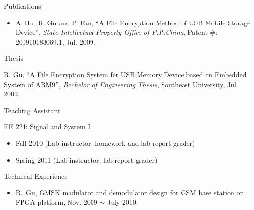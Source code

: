 \documentclass[10pt]{article}
\begin{document}
\begin{cv}
\begin{cvlist}{Publications}
\begin{itemize}
    \item A. Hu, R. Gu and P. Fan, ``A File Encryption Method of USB Mobile 
    Storage Device'', \emph{State Intellectual Property Office of 
    P.R.China}, Patent \#: 200910183069.1, Jul. 2009.
  \end{itemize}
\end{cvlist}

\setlength{\cvlabelsep}{\oldcvlabelsep}
\setlength{\cvlabelwidth}{1em}
\begin{cvlist}{Thesis}
\item R. Gu, ``A File Encryption System for USB Memory Device based on 
  Embedded System of ARM9'', \emph{Bachelor of Engineering Thesis}, 
  Southeast University, Jul. 2009.
\end{cvlist}

\begin{cvlist}{Teaching Assistant}
\item EE 224: Signal and System I
  \setlength{\oldtemp}{\parskip}
  \setlength{\parskip}{-0.05em}
  \begin{itemize}\itemsep=0.05em
      \item Fall 2010 (Lab instructor, homework and lab report grader)
      \item Spring 2011 (Lab instructor, lab report grader)
    \end{itemize}
\end{cvlist}
\setlength{\parskip}{\oldtemp}


\setlength{\cvlabelwidth}{0em}
\setlength{\cvlabelsep}{\labelsep}
\begin{cvlist}{Technical Experience}
\item
\begin{itemize}\itemsep=0.25em
    \item R.~Gu, GMSK modulator and demodulator design for GSM base station 
      on FPGA platform, Nov. 2009 $\sim$ July 2010.


\end{itemize}
\end{cvlist}
\end{cv}
\end{document}
